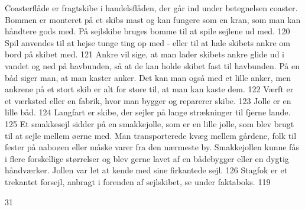 Coasterflåde er fragtskibe i handelsflåden, der går ind under
betegnelsen coaster. Bommen er monteret på et skibs mast og kan fungere
som en kran, som man kan håndtere gods med. På sejlskibe bruges bomme
til at spile sejlene ud med. 120 Spil anvendes til at hejse tunge ting
op med - eller til at hale skibets ankre om bord på skibet med. 121
Ankre vil sige, at man lader skibets ankre glide ud i vandet og ned på
havbunden, så at de kan holde skibet fast til havbunden. På en båd siger
man, at man kaster anker. Det kan man også med et lille anker, men
ankrene på et stort skib er alt for store til, at man kan kaste dem. 122
Værft er et værksted eller en fabrik, hvor man bygger og reparerer
skibe. 123 Jolle er en lille båd. 124 Langfart er skibe, der sejler på
lange strækninger til fjerne lande. 125 Et smakkesejl sidder på en
smakkejolle, som er en lille jolle, som blev brugt til at sejle mellem
øerne med. Man transporterede kvæg mellem gårdene, folk til fester på
naboøen eller måske varer fra den nærmeste by. Smakkejollen kunne fås i
flere forskellige størrelser og blev gerne lavet af en bådebygger eller
en dygtig håndværker. Jollen var let at kende med sine firkantede sejl.
126 Stagfok er et trekantet forsejl, anbragt i forenden af sejlskibet,
se under faktaboks. 119

31

